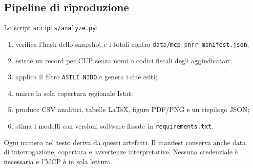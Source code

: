 \documentclass[10pt,a4paper]{article}
\begin{document}
\subsection{Pipeline di riproduzione}

Lo script \texttt{scripts/analyze.py}:

\begin{enumerate}
  \item verifica l'hash dello snapshot e i totali contro \texttt{data/mcp\_pnrr\_manifest.json};
  \item estrae un record per CUP senza nomi o codici fiscali degli aggiudicatari;
  \item applica il filtro \texttt{ASILI NIDO} e genera i due esiti;
  \item unisce la sola copertura regionale Istat;
  \item produce CSV analitici, tabelle LaTeX, figure PDF/PNG e un riepilogo JSON;
  \item stima i modelli con versioni software fissate in \texttt{requirements.txt}.
\end{enumerate}

Ogni numero nel testo deriva da questi artefatti. Il manifest conserva anche data di interrogazione, copertura e avvertenze interpretative. Nessuna credenziale è necessaria e l'MCP è in sola lettura.
\end{document}
